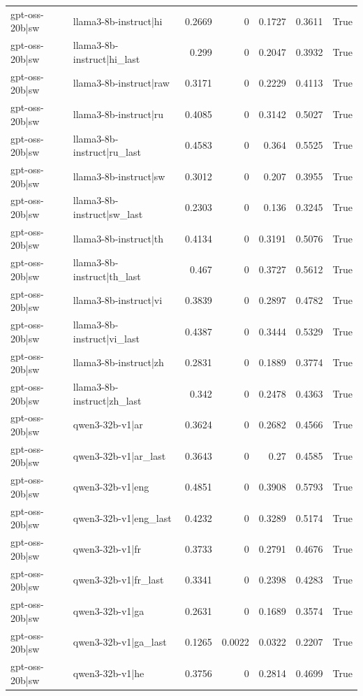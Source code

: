\begin{table}
\begin{tabular}{l l r r r r l}
gpt-oss-20b|sw & llama3-8b-instruct|hi & 0.2669 & 0 & 0.1727 & 0.3611 & True \\
gpt-oss-20b|sw & llama3-8b-instruct|hi_last & 0.299 & 0 & 0.2047 & 0.3932 & True \\
gpt-oss-20b|sw & llama3-8b-instruct|raw & 0.3171 & 0 & 0.2229 & 0.4113 & True \\
gpt-oss-20b|sw & llama3-8b-instruct|ru & 0.4085 & 0 & 0.3142 & 0.5027 & True \\
gpt-oss-20b|sw & llama3-8b-instruct|ru_last & 0.4583 & 0 & 0.364 & 0.5525 & True \\
gpt-oss-20b|sw & llama3-8b-instruct|sw & 0.3012 & 0 & 0.207 & 0.3955 & True \\
gpt-oss-20b|sw & llama3-8b-instruct|sw_last & 0.2303 & 0 & 0.136 & 0.3245 & True \\
gpt-oss-20b|sw & llama3-8b-instruct|th & 0.4134 & 0 & 0.3191 & 0.5076 & True \\
gpt-oss-20b|sw & llama3-8b-instruct|th_last & 0.467 & 0 & 0.3727 & 0.5612 & True \\
gpt-oss-20b|sw & llama3-8b-instruct|vi & 0.3839 & 0 & 0.2897 & 0.4782 & True \\
gpt-oss-20b|sw & llama3-8b-instruct|vi_last & 0.4387 & 0 & 0.3444 & 0.5329 & True \\
gpt-oss-20b|sw & llama3-8b-instruct|zh & 0.2831 & 0 & 0.1889 & 0.3774 & True \\
gpt-oss-20b|sw & llama3-8b-instruct|zh_last & 0.342 & 0 & 0.2478 & 0.4363 & True \\
gpt-oss-20b|sw & qwen3-32b-v1|ar & 0.3624 & 0 & 0.2682 & 0.4566 & True \\
gpt-oss-20b|sw & qwen3-32b-v1|ar_last & 0.3643 & 0 & 0.27 & 0.4585 & True \\
gpt-oss-20b|sw & qwen3-32b-v1|eng & 0.4851 & 0 & 0.3908 & 0.5793 & True \\
gpt-oss-20b|sw & qwen3-32b-v1|eng_last & 0.4232 & 0 & 0.3289 & 0.5174 & True \\
gpt-oss-20b|sw & qwen3-32b-v1|fr & 0.3733 & 0 & 0.2791 & 0.4676 & True \\
gpt-oss-20b|sw & qwen3-32b-v1|fr_last & 0.3341 & 0 & 0.2398 & 0.4283 & True \\
gpt-oss-20b|sw & qwen3-32b-v1|ga & 0.2631 & 0 & 0.1689 & 0.3574 & True \\
gpt-oss-20b|sw & qwen3-32b-v1|ga_last & 0.1265 & 0.0022 & 0.0322 & 0.2207 & True \\
gpt-oss-20b|sw & qwen3-32b-v1|he & 0.3756 & 0 & 0.2814 & 0.4699 & True \\

\end{tabular}
\end{table}
